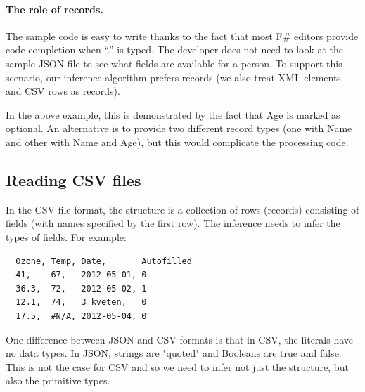 \documentclass[preprint]{sigplanconf}
\newcommand{\kvd}[1]{\textnormal{\textcolor{kvdclr}{\sffamily #1}}}
\newcommand{\str}[1]{\textnormal{\textcolor{strclr}{\sffamily "#1"}}}
\newcommand{\ident}[1]{\textnormal{\sffamily #1}}
\begin{document}
\paragraph{The role of records.}
The sample code is easy to write thanks to the fact that most F\# editors provide code completion
when ``.'' is typed. The developer does not need to look at the sample JSON file to see what fields
are available for a person. To support this scenario, our inference algorithm prefers records
(we also treat XML elements and CSV rows as records).

In the above example, this is demonstrated by the fact that \ident{Age} is marked as optional.
An alternative is to provide two different record types (one with \ident{Name} and other with 
\ident{Name} and \ident{Age}), but this would complicate the processing code.


\subsection{Reading CSV files}
\label{sec:providers-csv}

In the CSV file format, the structure is a collection of rows (records) consisting of fields 
(with names specified by the first row). The inference needs to infer the types of fields.
For example:
%
{\small{
\begin{verbatim}
  Ozone, Temp, Date,       Autofilled
  41,    67,   2012-05-01, 0
  36.3,  72,   2012-05-02, 1
  12.1,  74,   3 kveten,   0
  17.5,  #N/A, 2012-05-04, 0
\end{verbatim}
}}
%
\noindent
One difference between JSON and CSV formats is that in CSV, the literals have no data types.
In JSON, strings are \str{quoted} and Booleans are \kvd{true} and \kvd{false}. This is not the
case for CSV and so we need to infer not just the structure, but also the primitive types.
\end{document}
